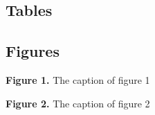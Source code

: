 \documentclass[
  12pt,
  letterpaper,
  DIV=11,
  numbers=noendperiod]{scrartcl}
\begin{document}
\newpage

\hypertarget{tables}{%
\subsection{Tables}\label{tables}}

\hypertarget{figures}{%
\subsection{Figures}\label{figures}}

\textbf{Figure 1.} The caption of figure 1

\newpage

\textbf{Figure 2.} The caption of figure 2
\end{document}
